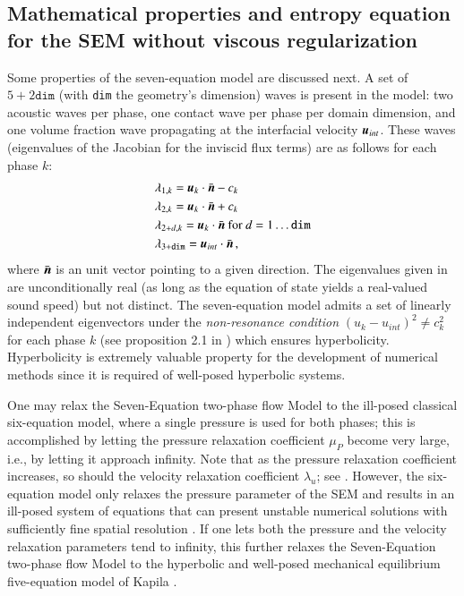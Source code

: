 \subsection{Mathematical properties and entropy equation for the SEM without viscous regularization}\label{eq:sem-ent-wv}
Some properties of the seven-equation model are discussed next. A set of $5+2\texttt{dim}$ (with \texttt{dim} the geometry's dimension) waves 
is present in the model: two acoustic waves per phase, one contact wave per phase per domain dimension, and one volume fraction wave propagating 
at the interfacial velocity $\boldsymbol u_{int}$. These waves (eigenvalues of the Jacobian for the inviscid flux terms) are as follows for each phase $k$:
% 
\begin{align}\label{eq:eigenvalues}
&\lambda_{1,k} = \boldsymbol u_k \cdot \bar{\boldsymbol n} - c_k \nonumber\\
&\lambda_{2,k} = \boldsymbol u_k \cdot \bar{\boldsymbol n} + c_k \nonumber\\
&\lambda_{2+d,k} = \boldsymbol u_k \cdot \bar{\boldsymbol n} \text{ for } d = 1 \dots \texttt{dim} \\
&\lambda_{3+\texttt{dim}} = \boldsymbol u_{int} \cdot \bar{\boldsymbol n} \nonumber \,,
\end{align}
%
where $\bar{\boldsymbol n}$ is an unit vector pointing to a given direction. The eigenvalues given in  are unconditionally 
real (as long as the equation of state yields a real-valued sound speed) but not distinct. The seven-equation model admits a set of linearly
independent eigenvectors under the \emph{non-resonance condition} $(u_k-u_{int})^2 \neq c_k^2$ for each phase $k$ (see proposition 2.1 in \cite{coquel_herard})
which ensures hyperbolicity.
Hyperbolicity is extremely valuable property for 
the development of numerical methods since it is required of well-posed hyperbolic systems.

One may relax the Seven-Equation two-phase flow Model to
the ill-posed classical six-equation model, where a single pressure 
is used for both phases; this is
accomplished by letting the pressure relaxation coefficient $\mu_P$ become
very large, i.e., by letting it approach infinity.  Note that as the pressure
relaxation coefficient increases, so should the velocity
relaxation coefficient $\lambda_u$; see . 
However, the six-equation model only relaxes the pressure parameter of the SEM and results
in an ill-posed system of equations that can present unstable numerical solutions
with sufficiently fine spatial resolution \cite{SEM,Herrard_2005}. 
%
If one lets both the pressure and the velocity relaxation parameters tend to infinity, this further relaxes the
Seven-Equation two-phase flow Model to the hyperbolic and well-posed 
mechanical equilibrium five-equation model of Kapila \cite{Kapila_2001}.  

